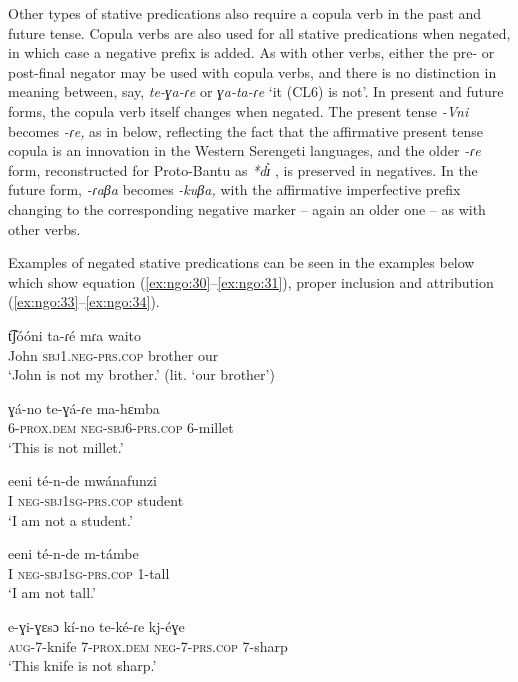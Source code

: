 \documentclass[output=paper,colorlinks,citecolor=brown,draftmode]{langscibook}
\begin{document}
Other types of stative predications also require a copula verb in the past and future tense. Copula verbs are also used for all stative predications when negated, in which case a negative prefix is added. As with other verbs, either the pre- or post-final negator may be used with copula verbs, and there is no distinction in meaning between, say, \textit{te-ɣa-ɾe} or \textit{ɣa-ta-ɾe} ‘it (CL6) is not’. In present and future forms, the copula verb itself changes when negated. The present tense \textit{{}-Vni} becomes \-\textit{{}-ɾe,} as in  below, reflecting the fact that the affirmative present tense copula is an innovation in the Western Serengeti languages, and the older \textit{{}-ɾe} form, reconstructed for Proto-Bantu as \textit{*dɪ̀} \citep{BastinEtAl2002}, is preserved in negatives. In the future form, \textit{{}-ɾaβa} becomes \textit{{}-kuβa,} with the affirmative imperfective prefix changing to the corresponding negative marker – again an older one – as with other verbs.

Examples of negated stative predications can be seen in the examples below which show equation (\ref{ex:ngo:30}--\ref{ex:ngo:31}), proper inclusion  and attribution (\ref{ex:ngo:33}--\ref{ex:ngo:34}).

\ea\label{ex:ngo:30} 
    \gll t͡ʃóóni ta-ɾé mɾa waito \\ 
        John \textsc{sbj}1.\textsc{neg-}\textsc{prs.cop} brother our \\
    \glt ‘John is not my brother.’ (lit. ‘our brother')
\z

\ea\label{ex:ngo:31} 
    \gll ɣá-no te-ɣá-ɾe ma-hɛmba\\ 
     6-\textsc{prox.dem} \textsc{neg-sbj6-}\textsc{prs.cop} 6-millet\\
    \glt ‘This is not millet.’
\z 

\ea\label{ex:ngo:32} 
    \gll eeni té{}-n{}-de mwánafunzi \\ 
     I \textsc{neg-sbj}1\textsc{sg{}-prs.cop} student\\
    \glt ‘I am not a student.’
\z 

\ea\label{ex:ngo:33} 
    \gll eeni té-n-de m-támbe \\ 
     I \textsc{neg{}-sbj1sg{}-prs.cop} 1-tall\\
    \glt ‘I am not tall.’
\z 

\ea\label{ex:ngo:34} 
    \gll e{}-ɣi{}-ɣɛsɔ kí{}-no te{}-ké{}-ɾe kj-éɣe\\ 
     \textsc{aug-}7-knife 7-\textsc{prox.dem} \textsc{neg}{}-7-\textsc{prs.cop} 7-sharp\\
    \glt ‘This knife is not sharp.’
\z 
\end{document}
